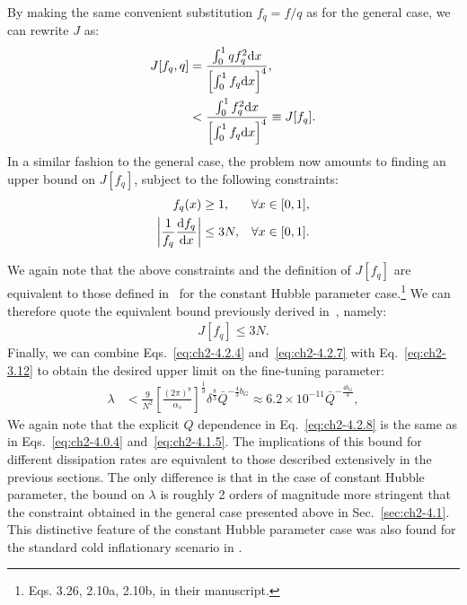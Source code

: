 By making the same convenient substitution $f_q=f/q$ as for the general case, we can rewrite $J$ as:
\begin{align}
    J[f_q,q] &= \frac{\int_{0}^{1} qf_q^{2} {\rm d} x}{\left[\int_{0}^{1} f_q  {\rm d} x\right]^{4}}, \nonumber\\ &< \frac{\int_{0}^{1} f_q^{2} {\rm d} x}{\left[\int_{0}^{1} f_q  {\rm d} x\right]^{4}} \equiv J[f_q]. \label{eq:ch2-4.2.4}
\end{align}
In a similar fashion to the general case, the problem now amounts to finding an upper bound  on $J[f_q]$, subject to the following constraints:
\begin{align}
    f_q(x)&\geq 1, & \forall x \in[0,1], \label{eq:ch2-4.2.5}\\
\left|\frac{1}{f_q} \frac{{\rm d} f_q}{{\rm d} x}\right| &\leq 3 N, & \forall x \in[0,1]. \label{eq:ch2-4.2.6}
\end{align}

We again note that the above constraints and the definition of $J[f_q]$ are equivalent to those defined in~\citep{Adams:1990pn} for the constant Hubble parameter case.\footnote{Eqs. 3.26, 2.10a, 2.10b, in their manuscript.} We can therefore quote the equivalent bound previously derived in~\citep{Adams:1990pn}, namely:
\begin{align}
 J[f_q]\leq 3N. \label{eq:ch2-4.2.7}
\end{align}
Finally, we can combine Eqs.~\ref{eq:ch2-4.2.4} and~\ref{eq:ch2-4.2.7} with Eq.~\ref{eq:ch2-3.12} to obtain the desired upper limit on the fine-tuning parameter:
\begin{align}
    \lambda &< \frac{9}{N^2}\left[\frac{(2\pi)^8}{\alpha_s}\right]^{\frac{1}{3}}\delta^{\frac{8}{3}} \bar{Q}^{-\frac{4}{3}b_G}\approx 6.2\times 10^{-11} \bar{Q}^{-\frac{4b_G}{3}}, \label{eq:ch2-4.2.8}
\end{align}
We again note that the explicit $Q$ dependence in Eq.~\ref{eq:ch2-4.2.8} is the same as in Eqs.~\ref{eq:ch2-4.0.4} and~\ref{eq:ch2-4.1.5}. The implications of this bound for different dissipation rates are equivalent to those described extensively in the previous sections. The only difference is that in the case of constant Hubble parameter, the bound on $\lambda$ is roughly 2 orders of magnitude more stringent that the constraint obtained in the general case presented above in Sec.~\ref{sec:ch2-4.1}. This distinctive feature of the constant Hubble parameter case was also found for the standard cold inflationary scenario in \citep{Adams:1990pn}.

